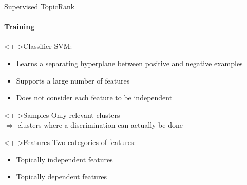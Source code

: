   \begin{frame}{Supervised TopicRank}
    \framesubtitle{Training}

    \begin{block}<+->{Classifier}
      SVM:
      \begin{itemize}
        \item{Learns a separating hyperplane between positive and negative
              examples}
        \item{Supports a large number of features}
        \item{Does not consider each feature to be independent}
      \end{itemize}
    \end{block}

    \begin{block}<+->{Samples}
      Only relevant clusters\\
      $\Rightarrow$ clusters where a discrimination can actually be done
    \end{block}

    \begin{block}<+->{Features}
      Two categories of features:
      \begin{itemize}
        \item{Topically independent features}
        \item{Topically dependent features}
      \end{itemize}
    \end{block}
  \end{frame}


